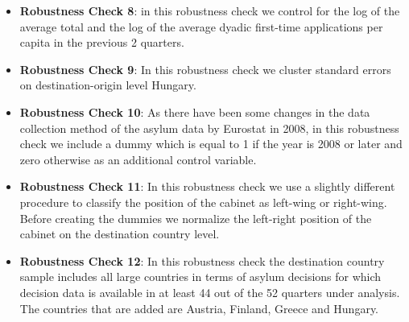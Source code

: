 \documentclass[11pt,a4paper]{scrartcl}
\begin{document}
\begin{itemize}
	\item \textbf{Robustness Check 8}: in this robustness check we control for the log of the average total and the log of the average dyadic first-time applications per capita in the previous 2 quarters.
	
	\item \textbf{Robustness Check 9}: In this robustness check we cluster standard errors on destination-origin level Hungary.  
	
	\item \textbf{Robustness Check 10}: As there have been some changes in the data collection method of the asylum data by Eurostat in 2008, in this robustness check we include a dummy which is equal to 1 if the year is 2008 or later and zero otherwise as an additional control variable. 

	\item \textbf{Robustness Check 11}: In this robustness check we use a slightly different procedure to classify the position of the cabinet as left-wing or right-wing. Before creating the dummies we normalize the left-right position of the cabinet on the destination country level.

	\item \textbf{Robustness Check 12}: In this robustness check the destination country sample includes all large countries in terms of asylum decisions for which decision data is available in at least 44 out of the 52 quarters under analysis. The countries that are added are Austria, Finland, Greece and Hungary. 
	 
\end{itemize}	
	

\clearpage
\FloatBarrier

\end{document}
